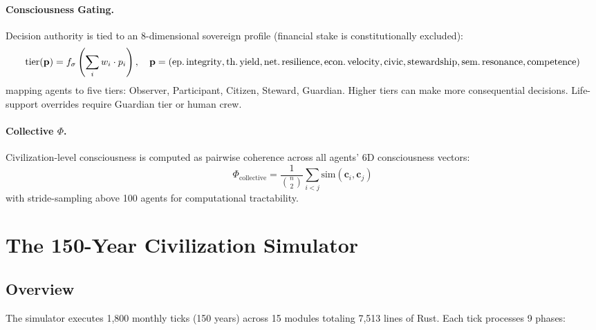 \documentclass[12pt,a4paper]{article}
\begin{document}
\paragraph{Consciousness Gating.} Decision authority is tied to an 8-dimensional sovereign profile (financial stake is constitutionally excluded):
\begin{equation}
    \text{tier}(\mathbf{p}) = f_\sigma\left(\sum_i w_i \cdot p_i\right), \quad \mathbf{p} = (\text{ep.\,integrity}, \text{th.\,yield}, \text{net.\,resilience}, \text{econ.\,velocity}, \text{civic}, \text{stewardship}, \text{sem.\,resonance}, \text{competence})
\end{equation}
mapping agents to five tiers: Observer, Participant, Citizen, Steward, Guardian. Higher tiers can make more consequential decisions. Life-support overrides require Guardian tier or human crew.

\paragraph{Collective $\Phi$.} Civilization-level consciousness is computed as pairwise coherence across all agents' 6D consciousness vectors:
\begin{equation}
    \Phi_\text{collective} = \frac{1}{\binom{n}{2}} \sum_{i<j} \text{sim}(\mathbf{c}_i, \mathbf{c}_j)
\end{equation}
with stride-sampling above 100 agents for computational tractability.


\section{The 150-Year Civilization Simulator}
\label{sec:simulator}

\subsection{Overview}

The simulator executes 1,800 monthly ticks (150 years) across 15 modules totaling 7,513 lines of Rust. Each tick processes 9 phases:
\end{document}
